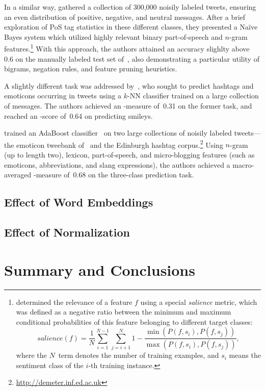 In a similar way, \citet{Pak:10} gathered a collection of 300,000
noisily labeled tweets, ensuring an even distribution of positive,
negative, and neutral messages.  After a brief exploration of PoS tag
statistics in these different classes, they presented a Na{\"i}ve
Bayes system which utilized highly relevant binary part-of-speech and
$n$-gram features.\footnote{\citet{Pak:10} determined the relevance of
  a feature $f$ using a special \emph{salience} metric, which was
  defined as a negative ratio between the minimum and maximum
  conditional probabilities of this feature belonging to different
  target classes:
  \begin{equation*}
    salience(f) = \frac{1}{N}\sum_{i=1}^{N-1}\sum_{j=i+1}^N 1 - \frac{\min(P(f, s_i), P(f, s_j))}{\max(P(f, s_i), P(f, s_j))},
  \end{equation*}
  where the $N$~term denotes the number of training examples, and
  $s_i$ means the sentiment class of the $i$-th training instance.}
With this approach, the authors attained an accuracy slighlty above
0.6 on the manually labeled test set of~\citet{Go:09}, also
demonstrating a particular utility of bigrams, negation rules, and
feature pruning heuristics.

A slightly different task was addressed by~\citet{Davidov:10}, who
sought to predict hashtags and emoticons occurring in tweets using a
$k$-NN classifier trained on a large collection of messages.  The
authors achieved an \F-measure of~0.31 on the former task, and reached
an \F-score of~0.64 on predicting smileys.

\citet{Kouloumpis:11} trained an AdaBoost
classifier~\cite{Schapire:00} on two large collections of noisily
labeled tweets---the emoticon tweebank of~\citet{Go:09} and the
Edinburgh hashtag corpus.\footnote{\url{http://demeter.inf.ed.ac.uk}}
Using $n$-gram (up to length two), lexicon, part-of-speech, and
micro-blogging features (such as emoticons, abbreviations, and slang
expressions), the authors achieved a macro-averaged \F-measure of~0.68
on the three-class prediction task.

\subsection{Effect of Word Embeddings}
\subsection{Effect of Normalization}

\section{Summary and Conclusions}\label{slsa:subsec:conclusions}
